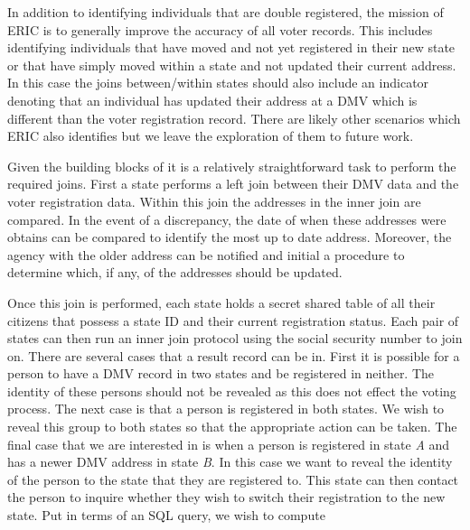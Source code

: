 In addition to identifying individuals that are double registered, the mission of ERIC is to generally improve the accuracy of all voter records. This includes identifying individuals that have moved and not yet registered in their new state or that have simply moved within a state and not updated their current address. In this case the joins between/within states should also include an indicator denoting that an individual has updated their address at a DMV which is different than the voter registration record. There are likely other scenarios which ERIC also identifies but we leave the exploration of them to future work.

Given the building blocks of  it is a relatively straightforward task to perform the required joins. First a state performs a left join between their DMV data and the voter registration data. Within this join the addresses in the inner join are compared. In the event of a discrepancy, the date of when these addresses were obtains can be compared to identify the most up to date address. Moreover, the agency with the older address can be notified and initial a procedure to determine which, if any, of the addresses should be updated. 


Once this join is performed, each state holds a secret shared table of all their citizens that possess a state ID and their current registration status. Each pair of states can then run an inner join protocol using the social security number to join on. There are several cases that a result record can be in. First it is possible for a person to have a DMV record in two states and be registered in neither. The identity of these persons should not be revealed as this does not effect the voting process. The next case is that a person is registered in both states. We wish to reveal this group to both states so that the appropriate action can be taken. The final case that we are interested in is when a person is registered in state \emph{A} and has a newer DMV address in state \emph{B}. In this case we want to reveal the identity of the person to the state that they are registered to. This state can then contact the person to inquire whether they wish to switch their registration to the new state. Put in terms of an SQL query, we wish to compute 

